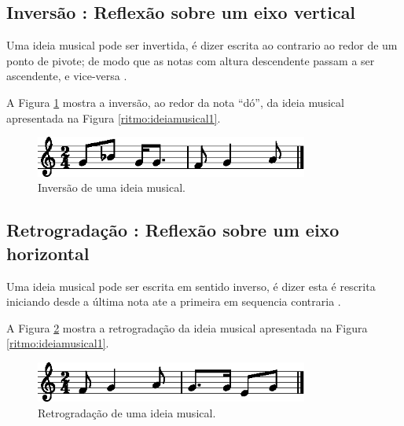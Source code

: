 \subsection{Inversão : Reflexão sobre um eixo vertical}

Uma ideia musical pode ser invertida, é dizer escrita ao contrario ao redor de um ponto de pivote;
de modo que as notas com altura descendente passam a ser ascendente, e vice-versa
\cite[pp. 30]{bennett1993elementos}.

A Figura \ref{ritmo:invert-ex1} mostra a inversão, ao redor da nota ``dó'', 
da ideia musical apresentada na Figura \ref{ritmo:ideiamusical1}.
\begin{figure}[H]
\centering
    \includegraphics[width=0.8\textwidth]{chapters/cap-musica-composer/invert-ex1-1.eps}
\caption{Inversão de uma ideia musical.}
\label{ritmo:invert-ex1}
\end{figure}


\subsection{Retrogradação : Reflexão sobre um eixo horizontal}

Uma ideia musical pode ser escrita em sentido inverso, 
é dizer esta é rescrita iniciando desde a última nota ate a primeira em sequencia contraria 
\cite[pp. 77]{arbones2012armonia}.

A Figura \ref{ritmo:retrogrado-ex1} mostra a retrogradação
da ideia musical apresentada na Figura \ref{ritmo:ideiamusical1}.
\begin{figure}[H]
\centering
    \includegraphics[width=0.8\textwidth]{chapters/cap-musica-composer/retrogrado-ex1-1.eps}
\caption{Retrogradação de uma ideia musical.}
\label{ritmo:retrogrado-ex1}
\end{figure}


